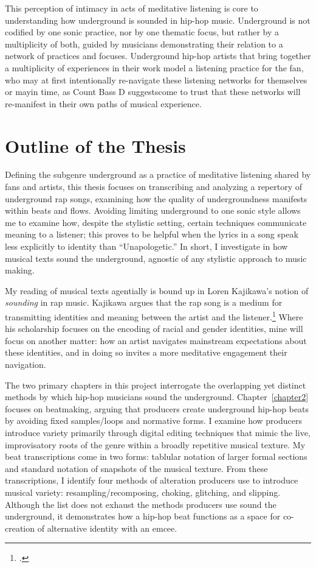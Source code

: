 This perception of intimacy in acts of meditative listening is core to understanding how underground
is sounded in hip-hop music. Underground is not codified by one sonic practice, nor by one thematic
focus, but rather by a multiplicity of both, guided by musicians demonstrating their relation to a 
network of practices and focuses. Underground hip-hop artists that bring together a multiplicity of
experiences in their work model a listening practice for the fan, who may at first intentionally re-navigate
these listening networks for themselves or may\textemdash in time, as Count Bass D suggests\textemdash come
to trust that these networks will re-manifest in their own paths of musical experience.


\section{Outline of the Thesis}

Defining the subgenre underground as a practice of meditative listening shared by fans and artists,
this thesis focuses on transcribing and analyzing a repertory of underground rap songs, examining
how the quality of undergroundness manifests within beats and flows. Avoiding limiting underground
to one sonic style allows me to examine how, despite the stylistic setting, certain techniques
communicate meaning to a listener; this proves to be helpful when the lyrics in a song speak less
explicitly to identity than ``Unapologetic.'' In short, I investigate in how musical texts sound
the underground, agnostic of any stylistic approach to music making.

My reading of musical texts agentially is bound up in Loren Kajikawa's notion of \emph{sounding} 
in rap music. Kajikawa argues that the rap song is a medium for transmitting identities and meaning 
between the artist and the listener.\footnote{
    \autocite[2]{lorenkajikawaSoundingRaceRap2015}.}
Where his scholarship focuses on the encoding of racial and gender identities, mine will focus on
another matter: how an artist navigates mainstream expectations about these identities, and 
in doing so invites a more meditative engagement their navigation.

The two primary chapters in this project interrogate the overlapping yet distinct methods by which
hip-hop musicians sound the underground. Chapter~\ref{chapter2} focuses on beatmaking, arguing that
producers create underground hip-hop beats by avoiding fixed samples/loops and normative forms. I 
examine how producers introduce variety primarily through digital editing techniques that mimic the
live, improvisatory roots of the genre within a broadly repetitive musical texture. My beat 
transcriptions come in two forms: tablular notation of larger formal sections and standard notation
of snapshots of the musical texture. From these transcriptions, I identify four methods of alteration
producers use to introduce musical variety: resampling/recomposing, choking, glitching, and slipping.
Although the list does not exhaust the methods producers use sound the underground, it demonstrates
how a hip-hop beat functions as a space for co-creation of alternative identity with an emcee.

